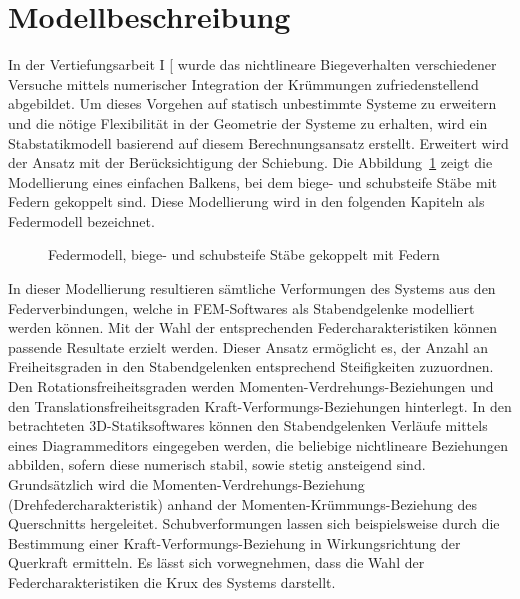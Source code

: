 \documentclass[
  11pt,
  letterpaper,
]{scrreprt}
\begin{document}
\section{Modellbeschreibung}\label{sec-modellvorstellung}

In der Vertiefungsarbeit I {[}\citeproc{ref-gitz_ansatze_2024}{1}{]}
wurde das nichtlineare Biegeverhalten verschiedener Versuche mittels
numerischer Integration der Krümmungen zufriedenstellend abgebildet. Um
dieses Vorgehen auf statisch unbestimmte Systeme zu erweitern und die
nötige Flexibilität in der Geometrie der Systeme zu erhalten, wird ein
Stabstatikmodell basierend auf diesem Berechnungsansatz erstellt.
Erweitert wird der Ansatz mit der Berücksichtigung der Schiebung. Die
Abbildung~\ref{fig-modell_drehfeder} zeigt die Modellierung eines
einfachen Balkens, bei dem biege- und schubsteife Stäbe mit Federn
gekoppelt sind. Diese Modellierung wird in den folgenden Kapiteln als
Federmodell bezeichnet.

\begin{figure}[H]


\caption{\label{fig-modell_drehfeder}Federmodell, biege- und schubsteife
Stäbe gekoppelt mit Federn}

\end{figure}%

In dieser Modellierung resultieren sämtliche Verformungen des Systems
aus den Federverbindungen, welche in FEM-Softwares als Stabendgelenke
modelliert werden können. Mit der Wahl der entsprechenden
Federcharakteristiken können passende Resultate erzielt werden. Dieser
Ansatz ermöglicht es, der Anzahl an Freiheitsgraden in den
Stabendgelenken entsprechend Steifigkeiten zuzuordnen. Den
Rotationsfreiheitsgraden werden Momenten-Verdrehungs-Beziehungen und den
Translationsfreiheitsgraden Kraft-Verformungs-Beziehungen hinterlegt. In
den betrachteten 3D-Statiksoftwares können den Stabendgelenken Verläufe
mittels eines Diagrammeditors eingegeben werden, die beliebige
nichtlineare Beziehungen abbilden, sofern diese numerisch stabil, sowie
stetig ansteigend sind. Grundsätzlich wird die
Momenten-Verdrehungs-Beziehung (Drehfedercharakteristik) anhand der
Momenten-Krümmungs-Beziehung des Querschnitts hergeleitet.
Schubverformungen lassen sich beispielsweise durch die Bestimmung einer
Kraft-Verformungs-Beziehung in Wirkungsrichtung der Querkraft ermitteln.
Es lässt sich vorwegnehmen, dass die Wahl der Federcharakteristiken die
Krux des Systems darstellt.
\end{document}
